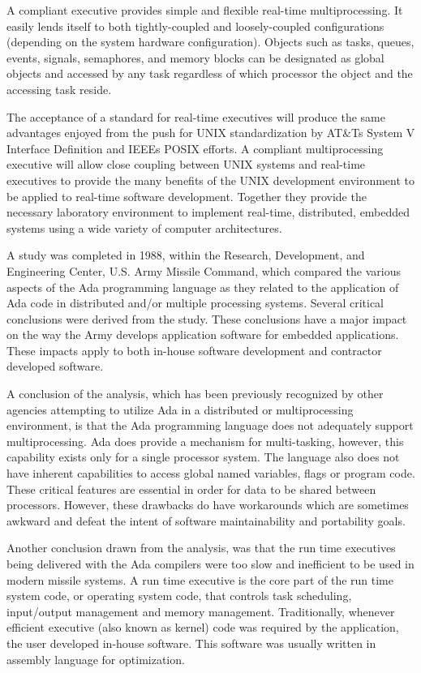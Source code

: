 A compliant executive provides simple and flexible real-\/time multiprocessing. It easily lends itself to both tightly-\/coupled and loosely-\/coupled configurations (depending on the system hardware configuration). Objects such as tasks, queues, events, signals, semaphores, and memory blocks can be designated as global objects and accessed by any task regardless of which processor the object and the accessing task reside.

The acceptance of a standard for real-\/time executives will produce the same advantages enjoyed from the push for U\+N\+IX standardization by AT\&T\textquotesingle{}s System V Interface Definition and I\+E\+EE\textquotesingle{}s P\+O\+S\+IX efforts. A compliant multiprocessing executive will allow close coupling between U\+N\+IX systems and real-\/time executives to provide the many benefits of the U\+N\+IX development environment to be applied to real-\/time software development. Together they provide the necessary laboratory environment to implement real-\/time, distributed, embedded systems using a wide variety of computer architectures.

A study was completed in 1988, within the Research, Development, and Engineering Center, U.\+S. Army Missile Command, which compared the various aspects of the Ada programming language as they related to the application of Ada code in distributed and/or multiple processing systems. Several critical conclusions were derived from the study. These conclusions have a major impact on the way the Army develops application software for embedded applications. These impacts apply to both in-\/house software development and contractor developed software.

A conclusion of the analysis, which has been previously recognized by other agencies attempting to utilize Ada in a distributed or multiprocessing environment, is that the Ada programming language does not adequately support multiprocessing. Ada does provide a mechanism for multi-\/tasking, however, this capability exists only for a single processor system. The language also does not have inherent capabilities to access global named variables, flags or program code. These critical features are essential in order for data to be shared between processors. However, these drawbacks do have workarounds which are sometimes awkward and defeat the intent of software maintainability and portability goals.

Another conclusion drawn from the analysis, was that the run time executives being delivered with the Ada compilers were too slow and inefficient to be used in modern missile systems. A run time executive is the core part of the run time system code, or operating system code, that controls task scheduling, input/output management and memory management. Traditionally, whenever efficient executive (also known as kernel) code was required by the application, the user developed in-\/house software. This software was usually written in assembly language for optimization.


